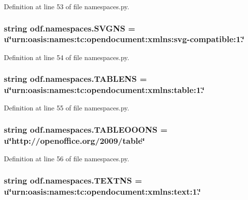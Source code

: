 Definition at line 53 of file namespaces.\+py.

\hypertarget{namespaceodf_1_1namespaces_a336271250de990d3c60711db94bb0213}{
\subsubsection[{S\+V\+G\+N\+S}]{\setlength{\rightskip}{0pt plus 5cm}string odf.\+namespaces.\+S\+V\+G\+N\+S = u\char`\"{}urn\+:oasis\+:names\+:tc\+:opendocument\+:xmlns\+:svg-\/compatible\+:1.\char`\"{}}}\label{namespaceodf_1_1namespaces_a336271250de990d3c60711db94bb0213}


Definition at line 54 of file namespaces.\+py.

\hypertarget{namespaceodf_1_1namespaces_a95de09133333b21b515d8dc0c4296619}{
\subsubsection[{T\+A\+B\+L\+E\+N\+S}]{\setlength{\rightskip}{0pt plus 5cm}string odf.\+namespaces.\+T\+A\+B\+L\+E\+N\+S = u\char`\"{}urn\+:oasis\+:names\+:tc\+:opendocument\+:xmlns\+:table\+:1.\char`\"{}}}\label{namespaceodf_1_1namespaces_a95de09133333b21b515d8dc0c4296619}


Definition at line 55 of file namespaces.\+py.

\hypertarget{namespaceodf_1_1namespaces_aa808632fffea3942c6cba8d731791eb5}{
\subsubsection[{T\+A\+B\+L\+E\+O\+O\+O\+N\+S}]{\setlength{\rightskip}{0pt plus 5cm}string odf.\+namespaces.\+T\+A\+B\+L\+E\+O\+O\+O\+N\+S = u\char`\"{}http\+://openoffice.\+org/2009/table\char`\"{}}}\label{namespaceodf_1_1namespaces_aa808632fffea3942c6cba8d731791eb5}


Definition at line 56 of file namespaces.\+py.

\hypertarget{namespaceodf_1_1namespaces_a0639228e91d426c8b4b9fc0de566393a}{
\subsubsection[{T\+E\+X\+T\+N\+S}]{\setlength{\rightskip}{0pt plus 5cm}string odf.\+namespaces.\+T\+E\+X\+T\+N\+S = u\char`\"{}urn\+:oasis\+:names\+:tc\+:opendocument\+:xmlns\+:text\+:1.\char`\"{}}}\label{namespaceodf_1_1namespaces_a0639228e91d426c8b4b9fc0de566393a}


